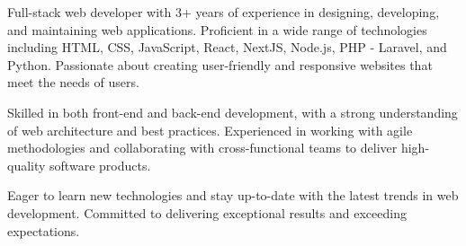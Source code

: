 

\begin{cvparagraph}

Full-stack web developer with 3+ years of experience in designing, developing, and maintaining web applications. Proficient in a wide range of technologies including HTML, CSS, JavaScript, React, NextJS, Node.js, PHP - Laravel, and Python. Passionate about creating user-friendly and responsive websites that meet the needs of users.

Skilled in both front-end and back-end development, with a strong understanding of web architecture and best practices. Experienced in working with agile methodologies and collaborating with cross-functional teams to deliver high-quality software products.

Eager to learn new technologies and stay up-to-date with the latest trends in web development. Committed to delivering exceptional results and exceeding expectations.
\end{cvparagraph}